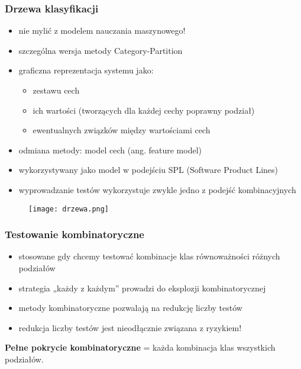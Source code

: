 \documentclass[../main.tex]{subfiles}
\begin{document}
    \subsubsection{Drzewa klasyfikacji}
    \begin{itemize}
        \item nie mylić z modelem nauczania maszynowego!
        \item szczególna wersja metody Category-Partition
        \item graficzna reprezentacja systemu jako:
        \begin{itemize}
            \item zestawu cech
            \item ich wartości (tworzących dla każdej cechy poprawny podział)
            \item ewentualnych związków między wartościami cech
        \end{itemize}
        \item odmiana metody: model cech (ang. feature model)
        \item wykorzystywany jako model w podejściu SPL (Software Product Lines)
        \item wyprowadzanie testów wykorzystuje zwykle jedno z podejść
        kombinacyjnych
    \end{itemize}

    \begin{figure}[H]
        \texttt{[image: drzewa.png]}
    \end{figure}

    \subsubsection{Testowanie kombinatoryczne}
    \begin{itemize}
        \item stosowane gdy chcemy testować kombinacje klas równoważności
        różnych podziałów
        \item strategia „każdy z każdym” prowadzi do eksplozji kombinatorycznej
        \item metody kombinatoryczne pozwalają na redukcję liczby testów
        \item redukcja liczby testów jest nieodłącznie związana z ryzykiem!
    \end{itemize}

    \textbf{Pełne pokrycie kombinatoryczne} = każda kombinacja klas wszystkich podziałów.
\end{document}
